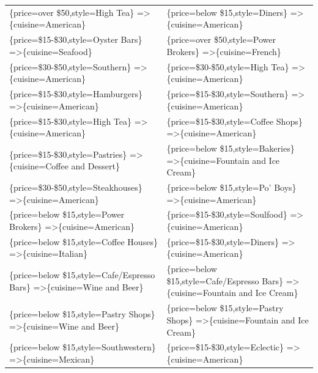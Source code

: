 \documentclass[letterpaper,10pt]{article}
\begin{document}
\begin{appendices}
\begin{table}[h]
\begin{adjustbox}{max width=\textwidth}
\begin{tabular}{ll}
\{price=over \$50,style=High Tea\} =\textgreater \{cuisine=American\} & \{price=below \$15,style=Diners\} =\textgreater \{cuisine=American\} \\ 
\{price=\$15-\$30,style=Oyster Bars\} =\textgreater \{cuisine=Seafood\} & \{price=over \$50,style=Power Brokers\} =\textgreater \{cuisine=French\} \\ 
\{price=\$30-\$50,style=Southern\} =\textgreater \{cuisine=American\} & \{price=\$30-\$50,style=High Tea\} =\textgreater \{cuisine=American\} \\ 
\{price=\$15-\$30,style=Hamburgers\} =\textgreater \{cuisine=American\} & \{price=\$15-\$30,style=Southern\} =\textgreater \{cuisine=American\} \\ 
\{price=\$15-\$30,style=High Tea\} =\textgreater \{cuisine=American\} & \{price=\$15-\$30,style=Coffee Shops\} =\textgreater \{cuisine=American\} \\ 
\{price=\$15-\$30,style=Pastries\} =\textgreater \{cuisine=Coffee and Dessert\} & \{price=below \$15,style=Bakeries\} =\textgreater \{cuisine=Fountain and Ice Cream\} \\ 
\{price=\$30-\$50,style=Steakhouses\} =\textgreater \{cuisine=American\} & \{price=below \$15,style=Po' Boys\} =\textgreater \{cuisine=American\} \\ 
\{price=below \$15,style=Power Brokers\} =\textgreater \{cuisine=American\} & \{price=\$15-\$30,style=Soulfood\} =\textgreater \{cuisine=American\} \\ 
\{price=below \$15,style=Coffee Houses\} =\textgreater \{cuisine=Italian\} & \{price=\$15-\$30,style=Diners\} =\textgreater \{cuisine=American\} \\ 
\{price=below \$15,style=Cafe/Espresso Bars\} =\textgreater \{cuisine=Wine and Beer\} & \{price=below \$15,style=Cafe/Espresso Bars\} =\textgreater \{cuisine=Fountain and Ice Cream\} \\ 
\{price=below \$15,style=Pastry Shops\} =\textgreater \{cuisine=Wine and Beer\} & \{price=below \$15,style=Pastry Shops\} =\textgreater \{cuisine=Fountain and Ice Cream\} \\ 
\{price=below \$15,style=Southwestern\} =\textgreater \{cuisine=Mexican\} & \{price=\$15-\$30,style=Eclectic\} =\textgreater \{cuisine=American\} \\ 
\end{tabular}
\end{adjustbox}
\end{table}
\clearpage
\newpage

\end{appendices}
\end{document}
